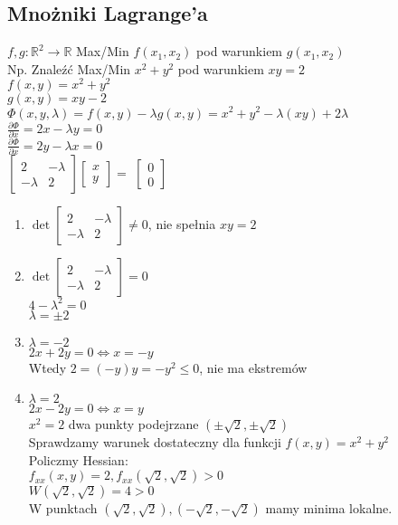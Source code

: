 \documentclass{article}
\theoremstyle{definition}
\theoremstyle{definition}
\theoremstyle{definition}
\theoremstyle{definition}
\begin{document}
\subsection{Mnożniki Lagrange'a}

$f, g : \mathbb{R}^2 \rightarrow \mathbb{R}$
Max/Min $f(x_1,x_2)$ pod warunkiem $g(x_1,x_2)$\\
Np. Znaleźć Max/Min $x^2+y^2$ pod warunkiem $xy=2$\\
$f(x,y)=x^2+y^2$\\
$g(x,y)=xy-2$\\
$\Phi(x,y,\lambda)=f(x,y)-\lambda g(x,y) = x^2+y^2 - \lambda(xy) + 2\lambda$\\
$\frac{\partial \Phi}{\partial x} = 2x - \lambda y = 0$\\
$\frac{\partial \Phi}{\partial x} = 2y - \lambda x = 0$\\
$ \begin{bmatrix}
    2 & -\lambda \\
    -\lambda & 2 
    \end{bmatrix}
\begin{bmatrix}
    x\\
    y
\end{bmatrix}
=
$
$
\begin{bmatrix}
0\\
0
\end{bmatrix}
$
\begin{enumerate}
    \item $\det \begin{bmatrix}
        2 & -\lambda \\
        -\lambda & 2 
        \end{bmatrix} \neq 0$, nie spełnia $xy=2$
    \item $\det \begin{bmatrix}
        2 & -\lambda \\
        -\lambda & 2 
        \end{bmatrix} = 0$\\
        $4-\lambda^2 =0$\\
        $\lambda = \pm 2$
    \item $\lambda = -2$\\
    $2x+2y=0\iff x=-y$\\
    Wtedy $2=(-y)y = -y^2\leq 0$, nie ma ekstremów
    \item $\lambda = 2$\\
    $2x-2y = 0 \iff x=y$\\
    $x^2=2$ dwa punkty podejrzane $(\pm\sqrt{2},\pm\sqrt{2})$\\
    Sprawdzamy warunek dostateczny dla funkcji $f(x,y)=x^2+y^2$\\
    Policzmy Hessian:\\
    $f_{xx}(x,y)=2, f_{xx} (\sqrt{2},\sqrt{2}) > 0$\\
    $W(\sqrt{2},\sqrt{2})=4>0$\\
    W punktach $(\sqrt{2},\sqrt{2}), (-\sqrt{2},-\sqrt{2})$ mamy minima lokalne.
\end{enumerate}
\end{document}
